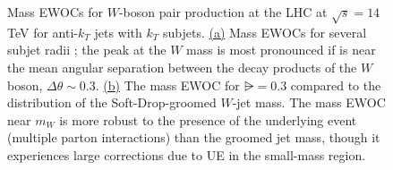 \begin{figure}[t!]
    \centering
    \caption[Mass EWOCs for \(W\)-boson pair production at the LHC at \(\sqrt{s} = 14\) TeV for anti-\(k_T\) jets with \(k_T\) subjets.]{
        Mass EWOCs for \(W\)-boson pair production at the LHC at \(\sqrt{s} = 14\) TeV for anti-\(k_T\) jets with \(k_T\) subjets.
        \hyperref[fig:money:rsubs]{(a)}
        Mass EWOCs for several subjet radii \rsub{};
        the peak at the $W$ mass is most pronounced if \rsub{} is near the mean angular separation between the decay products of the \(W\) boson, \(\Delta \theta \sim 0.3\).
        \hyperref[fig:money:mpi]{(b)}
        The mass EWOC for \(\rsub = 0.3\) compared to the distribution of the Soft-Drop-groomed \(W\)-jet mass.
        The mass EWOC near \(m_W\) is more robust to the presence of the underlying event (multiple parton interactions) than the groomed jet mass, though it experiences large corrections due to UE in the small-mass region.
    }
    \label{fig:pp_to_ww:money}
\end{figure}

